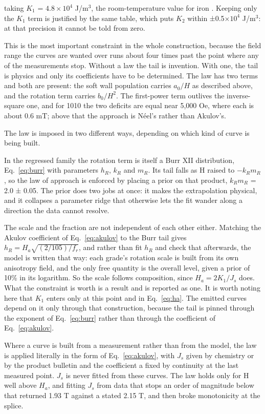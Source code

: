 \documentclass[
  11pt,
]{article}
\begin{document}
taking \(K_1\) = \(4.8\times10^{4}\) J/m\(^{3}\), the room-temperature value for iron \cite{wiki-anisotropy}. Keeping only the \(K_1\) term is justified by the same table, which puts \(K_2\) within ±0.5\(\times10^{4}\) J/m\(^{3}\): at that precision it cannot be told from zero.

This is the most important constraint in the whole construction, because the field range the curves are wanted over runs about four times past the point where any of the measurements stop. Without a law the tail is invention. With one, the tail is physics and only its coefficients have to be determined. The law has two terms and both are present: the soft wall population carries \(a_0/H\) as described above, and the rotation term carries \(b_0/H^{2}\). The first-power term outlives the inverse-square one, and for 1010 the two deficits are equal near 5,000 Oe, where each is about 0.6 mT; above that the approach is Néel's rather than Akulov's.

The law is imposed in two different ways, depending on which kind of curve is being built.

In the regressed family the rotation term is itself a Burr XII distribution, Eq.~\eqref{eq:burr} with parameters \(h_R\), \(k_R\) and \(m_R\). Its tail falls as H raised to \(-k_R m_R\), so the law of approach is enforced by placing a prior on that product, \(k_R m_R\) = 2.0 ± 0.05. The prior does two jobs at once: it makes the extrapolation physical, and it collapses a parameter ridge that otherwise lets the fit wander along a direction the data cannot resolve.

The scale and the fraction are not independent of each other either. Matching the Akulov coefficient of Eq.~\eqref{eq:akulov} to the Burr tail gives \(h_R = H_a\sqrt{(2/105)/f_r}\), and rather than fit \(h_R\) and check that afterwards, the model is written that way: each grade's rotation scale is built from its own anisotropy field, and the only free quantity is the overall level, given a prior of 10\% in its logarithm. So the scale follows composition, since \(H_a = 2K_1/J_s\) does. What the constraint is worth is a result and is reported as one. It is worth noting here that \(K_1\) enters only at this point and in Eq.~\eqref{eq:ha}. The emitted curves depend on it only through that construction, because the tail is pinned through the exponent of Eq.~\eqref{eq:burr} rather than through the coefficient of Eq.~\eqref{eq:akulov}.

Where a curve is built from a measurement rather than from the model, the law is applied literally in the form of Eq.~\eqref{eq:akulov}, with \(J_s\) given by chemistry or by the product bulletin and the coefficient a fixed by continuity at the last measured point. \(J_s\) is never fitted from these curves. The law holds only for H well above \(H_a\), and fitting \(J_s\) from data that stops an order of magnitude below that returned 1.93 T against a stated 2.15 T, and then broke monotonicity at the splice.
\end{document}
